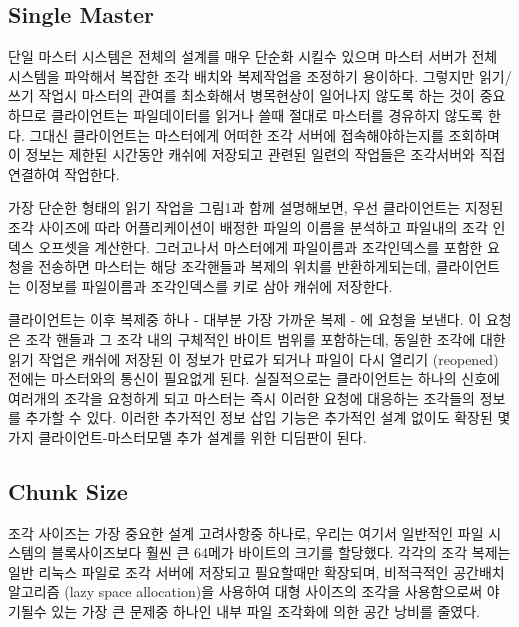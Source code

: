 \documentclass[twocolumn]{article}
\begin{document}
\subsection{Single Master}

  단일 마스터 시스템은 전체의 설계를 매우 단순화 시킬수 있으며 마스터 서버가 전체 시스템을 파악해서 복잡한 조각 배치와 복제작업을 조정하기 용이하다.  그렇지만 읽기/쓰기 작업시 마스터의 관여를 최소화해서 병목현상이 일어나지 않도록 하는 것이 중요하므로 클라이언트는 파일데이터를 읽거나 쓸때 절대로 마스터를 경유하지 않도록 한다.  그대신 클라이언트는 마스터에게 어떠한 조각 서버에 접속해야하는지를 조회하며 이 정보는 제한된 시간동안 캐쉬에 저장되고 관련된 일련의 작업들은 조각서버와 직접 연결하여 작업한다.

  가장 단순한 형태의 읽기 작업을 그림1과 함께 설명해보면, 우선 클라이언트는 지정된 조각 사이즈에 따라 어플리케이션이 배정한 파일의 이름을 분석하고 파일내의 조각 인덱스 오프셋을 계산한다. 그러고나서 마스터에게 파일이름과 조각인덱스를 포함한 요청을 전송하면 마스터는 해당 조각핸들과 복제의 위치를 반환하게되는데, 클라이언트는 이정보를 파일이름과 조각인덱스를 키로 삼아 캐쉬에 저장한다.

  클라이언트는 이후 복제중 하나 - 대부분 가장 가까운 복제 - 에 요청을 보낸다.  이 요청은 조각 핸들과 그 조각 내의 구체적인 바이트 범위를 포함하는데, 동일한 조각에 대한 읽기 작업은 캐쉬에 저장된 이 정보가 만료가 되거나 파일이 다시 열리기 (reopened) 전에는 마스터와의 통신이 필요없게 된다. 실질적으로는 클라이언트는 하나의 신호에 여러개의 조각을 요청하게 되고 마스터는 즉시 이러한 요청에 대응하는 조각들의 정보를 추가할 수 있다.  이러한 추가적인 정보 삽입 기능은 추가적인 설계 없이도 확장된 몇가지 클라이언트-마스터모델 추가 설계를 위한 디딤판이 된다.

\subsection{Chunk Size}

 조각 사이즈는 가장 중요한 설계 고려사항중 하나로, 우리는 여기서 일반적인 파일 시스템의 블록사이즈보다 훨씬 큰 64메가 바이트의 크기를 할당했다.  각각의 조각 복제는 일반 리눅스 파일로 조각 서버에 저장되고 필요할때만 확장되며,  비적극적인 공간배치 알고리즘 (lazy space allocation)을 사용하여 대형 사이즈의 조각을 사용함으로써 야기될수 있는 가장 큰 문제중 하나인 내부 파일 조각화에 의한 공간 낭비를 줄였다.
\end{document}
